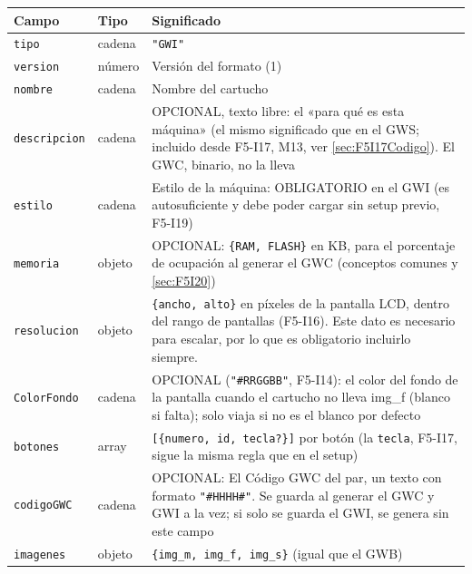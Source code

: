 {}

\begin{table}[H]
	\centering
	\small
	\begin{tabularx}{\textwidth}{@{} l l X @{}}
		\toprule
		\textbf{Campo} & \textbf{Tipo} & \textbf{Significado} \\
		\midrule
		\texttt{tipo} & cadena & \texttt{"GWI"} \\
		\texttt{version} & número & Versión del formato (1) \\
		\texttt{nombre} & cadena & Nombre del cartucho \\

		\texttt{descripcion} & cadena & OPCIONAL, texto libre: el «para qué es esta máquina» (el mismo significado que en el GWS; incluido desde F5-I17, M13, ver \ref{sec:F5I17Codigo}). El GWC, binario, no la lleva \\
		\texttt{estilo} & cadena & Estilo de la máquina: OBLIGATORIO en el GWI (es autosuficiente y debe poder cargar sin setup previo, F5-I19) \\
		\texttt{memoria} & objeto & OPCIONAL: \texttt{\{RAM, FLASH\}} en KB, para el porcentaje de ocupación al generar el GWC (conceptos comunes y \ref{sec:F5I20}) \\
		\texttt{resolucion}\footnotemark\setcounter{fnA02GWIuno}{\value{footnote}} & objeto & \texttt{\{ancho, alto\}} en píxeles de la pantalla LCD, dentro del rango de pantallas (F5-I16). Este dato es necesario para escalar, por lo que es obligatorio incluirlo siempre.\\
		\texttt{ColorFondo} & cadena & OPCIONAL (\texttt{"\#RRGGBB"}, F5-I14): el color del fondo de la pantalla cuando el cartucho no lleva img\_f (blanco si falta); solo viaja si no es el blanco por defecto \\
		\texttt{botones} & array & \texttt{[\{numero, id, tecla?\}]} por botón (la \texttt{tecla}, F5-I17, sigue la misma regla que en el setup) \\
		\texttt{codigoGWC}\footnotemark\setcounter{fnA02GWIdos}{\value{footnote}} & cadena & OPCIONAL: El Código GWC del par, un texto con formato \texttt{"\#HHHH\#"}. Se guarda al generar el GWC y GWI a la vez; si solo se guarda el GWI, se genera sin este campo \\
		\texttt{imagenes} & objeto & \texttt{\{img\_m, img\_f, img\_s\}} (igual que el GWB) \\


\end{tabularx}
\end{table}
